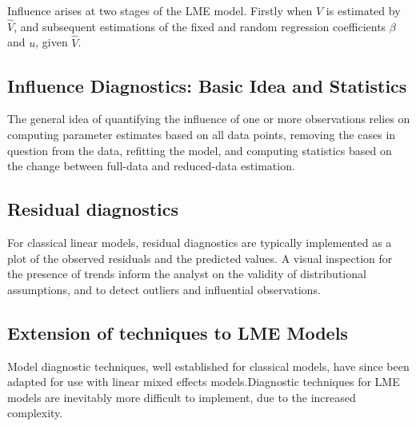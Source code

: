 \documentclass[12pt, a4paper]{article}
\begin{document}
			Influence arises at two stages of the LME model. Firstly when $V$ is estimated by $\hat{V}$, and subsequent
			estimations of the fixed and random regression coefficients $\beta$ and $u$, given $\hat{V}$.
			
			
			

			\subsection*{Influence Diagnostics: Basic Idea and Statistics} %
			
			The general idea of quantifying the influence of one or more observations relies on computing parameter estimates based on all data points, removing the cases in question from the data, refitting the model, and computing statistics based on the change between full-data and reduced-data estimation. 
			
			\subsection{Residual diagnostics} %
			For classical linear models, residual diagnostics are typically implemented as a plot of the observed residuals and the predicted values. A visual inspection for the presence of trends inform the analyst on the validity of distributional assumptions, and to detect outliers and influential observations.
			
			
			\subsection*{Extension of techniques to LME Models} %
			
			Model diagnostic techniques, well established for classical models, have since been adapted for use with linear mixed effects models.Diagnostic techniques for LME models are inevitably more difficult to implement, due to the increased complexity.
			
\end{document}
